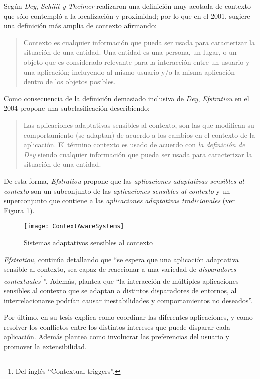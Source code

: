 Según \emph{Dey}, \emph{Schilit  y Theimer} realizaron una definición muy acotada de contexto que sólo contempló a la localización y proximidad; por lo que en el 2001, sugiere una definición más amplia de contexto afirmando:

\begin{quote}
Contexto es cualquier información que pueda ser usada para caracterizar la situación de una entidad. Una entidad es una persona, un lugar, o un objeto que es considerado relevante para la interacción entre un usuario y una aplicación; incluyendo al mismo usuario y/o la misma aplicación dentro de los objetos posibles.\cite[p.~3]{Dey01}
\end{quote}

Como consecuencia de la definición demasiado inclusiva de \emph{Dey}, \emph{Efstratiou} en el 2004 propone una subclasificación describiendo:

\begin{quote}
Las aplicaciones adaptativas sensibles al contexto, son las que modifican su comportamiento (se adaptan) de acuerdo a los cambios en el contexto de la aplicación. El término contexto es usado de acuerdo con \emph{la definición de Dey} siendo cualquier información que pueda ser usada para caracterizar la situación de una entidad.\cite[p.~4]{Efstratiou04}
\end{quote}

De esta forma, \emph{Efstratiou} propone que las \emph{aplicaciones adaptativas sensibles al contexto} son un subconjunto de las \emph{aplicaciones sensibles al contexto} y un superconjunto que contiene a las \emph{aplicaciones adaptativas tradicionales} (ver Figura \ref{AdaptiveContextAwareSystems}).

\begin{figure}[ht!]
\centering
\texttt{[image: ContextAwareSystems]}
\caption{Sistemas adaptativos sensibles al contexto}
\label{AdaptiveContextAwareSystems}
\end{figure}

\emph{Efstratiou}, continúa detallando que ``se espera que una aplicación adaptativa sensible al contexto, sea capaz de reaccionar a una variedad de \emph{disparadores contextuales}\footnote{Del inglés ``Contextual triggers''.}''. Además, plantea que ``la interacción de múltiples aplicaciones sensibles al contexto que se adaptan a distintos disparadores de entornos, al interrelacionarse podrían causar inestabilidades y comportamientos no deseados''.

Por último, en su tesis explica como coordinar las diferentes aplicaciones, y como resolver los conflictos entre los distintos intereses que puede disparar cada aplicación. Además plantea como involucrar las preferencias del usuario y promover la extensibilidad.

